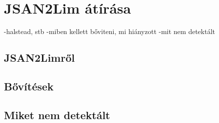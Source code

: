 \chapter*{JSAN2Lim átírása}
-halstead, stb
-miben kellett bőviteni, mi hiányzott
-mit nem detektált
\section{JSAN2Limről}

\section{Bővítések}

\section{Miket nem detektált}
